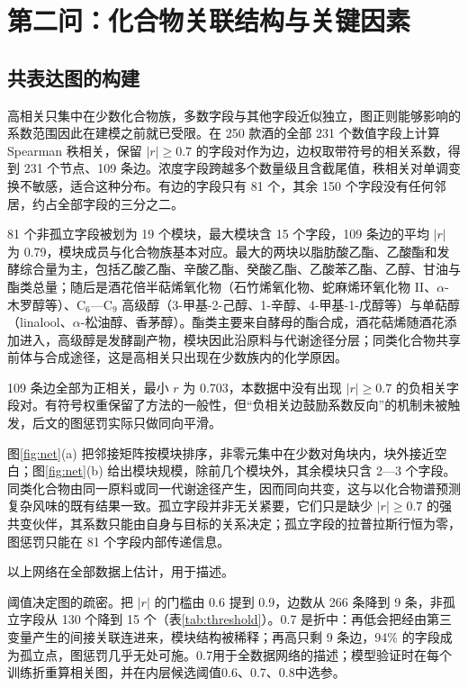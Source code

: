 \section{第二问：化合物关联结构与关键因素}\label{sec:q2}

\subsection{共表达图的构建}

高相关只集中在少数化合物族，多数字段与其他字段近似独立，图正则能够影响的系数范围因此在建模之前就已受限。在 250 款酒的全部 231 个数值字段上计算 Spearman 秩相关，保留 $|r|\ge0.7$ 的字段对作为边，边权取带符号的相关系数，得到 231 个节点、109 条边。浓度字段跨越多个数量级且含截尾值，秩相关对单调变换不敏感，适合这种分布。有边的字段只有 81 个，其余 150 个字段没有任何邻居，约占全部字段的三分之二。

81 个非孤立字段被划为 19 个模块，最大模块含 15 个字段，109 条边的平均 $|r|$ 为 0.79，模块成员与化合物族基本对应。最大的两块以脂肪酸乙酯、乙酸酯和发酵综合量为主，包括乙酸乙酯、辛酸乙酯、癸酸乙酯、乙酸苯乙酯、乙醇、甘油与酯类总量；随后是酒花倍半萜烯氧化物（石竹烯氧化物、蛇麻烯环氧化物 II、$\alpha$-木罗醇等）、C$_6$—C$_9$ 高级醇（3-甲基-2-己醇、1-辛醇、4-甲基-1-戊醇等）与单萜醇（linalool、$\alpha$-松油醇、香茅醇）。酯类主要来自酵母的酯合成，酒花萜烯随酒花添加进入，高级醇是发酵副产物，模块因此沿原料与代谢途径分层；同类化合物共享前体与合成途径，这是高相关只出现在少数族内的化学原因。

109 条边全部为正相关，最小 $r$ 为 0.703，本数据中没有出现 $|r|\ge0.7$ 的负相关字段对。有符号权重保留了方法的一般性，但“负相关边鼓励系数反向”的机制未被触发，后文的图惩罚实际只做同向平滑。

图\ref{fig:net}(a) 把邻接矩阵按模块排序，非零元集中在少数对角块内，块外接近空白；图\ref{fig:net}(b) 给出模块规模，除前几个模块外，其余模块只含 2—3 个字段。同类化合物由同一原料或同一代谢途径产生，因而同向共变，这与以化合物谱预测复杂风味的既有结果一致\cite{schreurs2024}。孤立字段并非无关紧要，它们只是缺少 $|r|\ge0.7$ 的强共变伙伴，其系数只能由自身与目标的关系决定；孤立字段的拉普拉斯行恒为零，图惩罚只能在 81 个字段内部传递信息。

以上网络在全部数据上估计，用于描述。

阈值决定图的疏密。把 $|r|$ 的门槛由 0.6 提到 0.9，边数从 266 条降到 9 条，非孤立字段从 130 个降到 15 个（表\ref{tab:threshold}）。0.7 是折中：再低会把经由第三变量产生的间接关联连进来，模块结构被稀释；再高只剩 9 条边，94\% 的字段成为孤立点，图惩罚几乎无处可施。0.7用于全数据网络的描述；模型验证时在每个训练折重算相关图，并在内层候选阈值0.6、0.7、0.8中选参。

